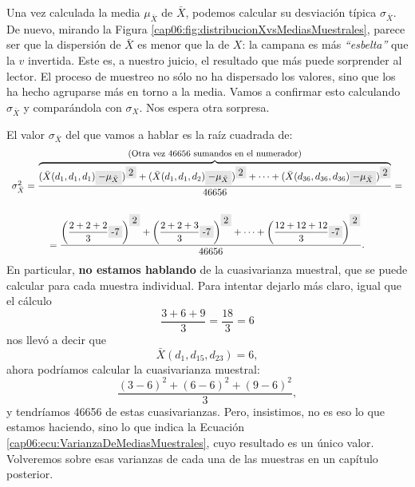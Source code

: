 \begin{ejemplo}
    Una vez calculada la media $\mu_{\bar X}$ de $\bar X$, podemos calcular su desviación típica $\sigma_{\bar X}$. %
    De nuevo, mirando la Figura \ref{cap06:fig:distribucionXvsMediasMuestrales}, parece ser que la dispersión de $\bar X$ es menor que la de $X$: la campana es más {\em ``esbelta''} que la $v$ invertida. Este es, a nuestro juicio, el resultado que más puede sorprender al lector.  El proceso de muestreo no sólo no ha dispersado los valores, sino que los ha hecho agruparse más en torno a la media. Vamos a confirmar esto calculando $\sigma_{\bar X}$ y comparándola con $\sigma_X$. Nos espera otra sorpresa.

    El valor $\sigma_{\bar X}$ del que vamos a hablar es la raíz cuadrada de:
    {\small
        \begin{equation}\label{cap06:ecu:VarianzaDeMediasMuestrales}
        \begin{array}{c}
        \sigma^2_{\bar X}=
        \dfrac{\overbrace{
        (\bar X(d_1,d_1,d_1)\colorbox{lightgrey}{$-\mu_{\bar X}$})^{\colorbox{lightgrey}{2}}+
        (\bar X(d_1,d_1,d_2)\colorbox{lightgrey}{$-\mu_{\bar X}$})^{\colorbox{lightgrey}{2}}+
        \cdots+
        (\bar X(d_{36},d_{36},d_{36})\colorbox{lightgrey}{$-\mu_{\bar X}$})^{\colorbox{lightgrey}{2}}
        }^{\mbox{\small(Otra vez 46656 sumandos en el numerador)}} }{46656}=
        \\[8mm]
        =\dfrac{\left(\dfrac{2+2+2}{3}\colorbox{lightgrey}{-7}\right)^{\colorbox{lightgrey}{2}}
        +\left(\dfrac{2+2+3}{3}\colorbox{lightgrey}{-7}\right)^{\colorbox{lightgrey}{2}}+
        \cdots+\left(\dfrac{12+12+12}{3}\colorbox{lightgrey}{-7}\right)^{\colorbox{lightgrey}{2}}}{46656}.
        \end{array}
        \end{equation}
        }
        En particular, {\bf no estamos hablando} de la cuasivarianza muestral, que se puede calcular para cada muestra individual. Para intentar dejarlo más claro, igual que el cálculo
        \[\dfrac{3+6+9}{3}=\dfrac{18}{3}=6\]
        nos llevó a decir que
        \[\bar X(d_1,d_{15},d_{23})=6,\]
        ahora podríamos calcular la cuasivarianza muestral:
        \[\dfrac{(3-6)^2+(6-6)^2+(9-6)^2}{3},\]
        y tendríamos 46656 de estas cuasivarianzas. Pero, insistimos, {\sf no es eso lo que estamos haciendo}, sino lo que indica la Ecuación \ref{cap06:ecu:VarianzaDeMediasMuestrales}, cuyo resultado es un único valor. Volveremos sobre esas varianzas de cada una de las muestras en un capítulo posterior.


\end{ejemplo}

